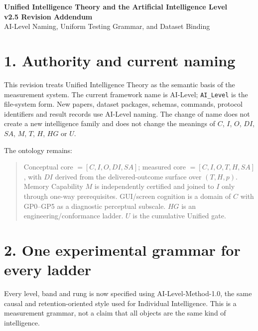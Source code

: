 \documentclass[11pt]{article}
\newcommand{\addendumtitle}[2]{%
  \begin{center}
    {\large\bfseries Unified Intelligence Theory and the Artificial Intelligence Level}\\[0.4em]
    {\bfseries #1}\\[0.2em]
    {\small #2}
  \end{center}
  \vspace{0.5em}}
\begin{document}
\addendumtitle{v2.5 Revision Addendum}{AI-Level Naming, Uniform Testing Grammar, and Dataset Binding}

\section*{1. Authority and current naming}

This revision treats Unified Intelligence Theory as the semantic basis of the measurement system. The current framework name is AI-Level; \texttt{AI\_Level} is the file-system form. New papers, dataset packages, schemas, commands, protocol identifiers and result records use AI-Level naming. The change of name does not create a new intelligence family and does not change the meanings of $C$, $I$, $O$, $DI$, $SA$, $M$, $T$, $H$, $HG$ or $U$.

The ontology remains:

\begin{quote}
Conceptual core $= [C, I, O, DI, SA]$; measured core $= [C, I, O, T, H, SA]$, with $DI$ derived from the delivered-outcome surface over $(T, H, p)$. Memory Capability $M$ is independently certified and joined to $I$ only through one-way prerequisites. GUI/screen cognition is a domain of $C$ with GP0--GP5 as a diagnostic perceptual subscale. $HG$ is an engineering/conformance ladder. $U$ is the cumulative Unified gate.
\end{quote}

\section*{2. One experimental grammar for every ladder}

Every level, band and rung is now specified using AI-Level-Method-1.0, the same causal and retention-oriented style used for Individual Intelligence. This is a measurement grammar, not a claim that all objects are the same kind of intelligence.
\end{document}
